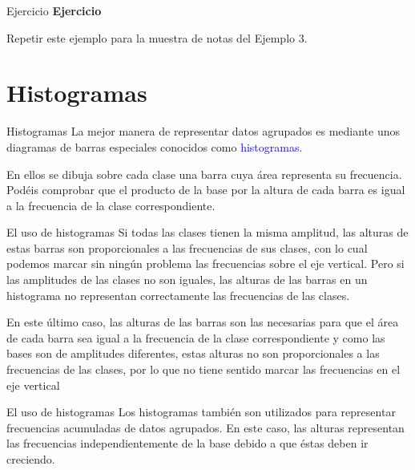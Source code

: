 \documentclass[
  ignorenonframetext,
]{beamer}
\newcommand\blue[1]{\textcolor{blue}{#1}}
\begin{document}
\begin{frame}{Ejercicio}
\label{ejercicio-1}
\textbf{Ejercicio}

Repetir este ejemplo para la muestra de notas del Ejemplo 3.
\end{frame}

\section{Histogramas}\label{histogramas}

\begin{frame}{Histogramas}
\label{histogramas-1}
La mejor manera de representar datos agrupados es mediante unos
diagramas de barras especiales conocidos como \blue{histogramas}.

En ellos se dibuja sobre cada clase una barra cuya área representa su
frecuencia. Podéis comprobar que el producto de la base por la altura de
cada barra es igual a la frecuencia de la clase correspondiente.
\end{frame}

\begin{frame}{El uso de histogramas}
\label{el-uso-de-histogramas}
Si todas las clases tienen la misma amplitud, las alturas de estas
barras son proporcionales a las frecuencias de sus clases, con lo cual
podemos marcar sin ningún problema las frecuencias sobre el eje
vertical. Pero si las amplitudes de las clases no son iguales, las
alturas de las barras en un histograma no representan correctamente las
frecuencias de las clases.

En este último caso, las alturas de las barras son las necesarias para
que el área de cada barra sea igual a la frecuencia de la clase
correspondiente y como las bases son de amplitudes diferentes, estas
alturas no son proporcionales a las frecuencias de las clases, por lo
que no tiene sentido marcar las frecuencias en el eje vertical
\end{frame}

\begin{frame}{El uso de histogramas}
\label{el-uso-de-histogramas-1}
Los histogramas también son utilizados para representar frecuencias
acumuladas de datos agrupados. En este caso, las alturas representan las
frecuencias independientemente de la base debido a que éstas deben ir
creciendo.
\end{frame}
\end{document}

